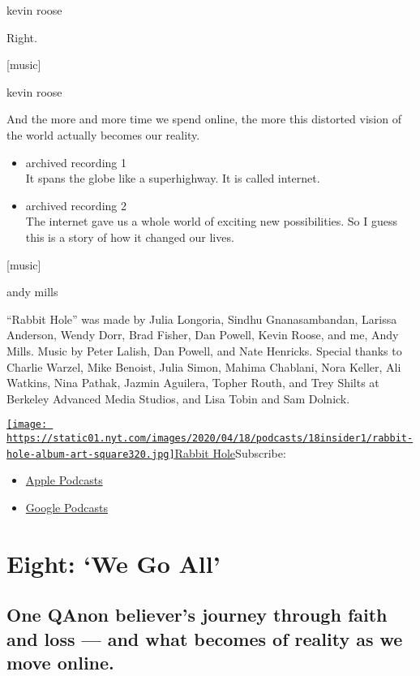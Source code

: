 kevin roose

Right.

{[}music{]}

kevin roose

And the more and more time we spend online, the more this distorted
vision of the world actually becomes our reality.

\begin{itemize}
\item
  archived recording 1\\
  It spans the globe like a superhighway. It is called internet.
\item
  archived recording 2\\
  The internet gave us a whole world of exciting new possibilities. So I
  guess this is a story of how it changed our lives.
\end{itemize}

{[}music{]}

andy mills

``Rabbit Hole'' was made by Julia Longoria, Sindhu Gnanasambandan,
Larissa Anderson, Wendy Dorr, Brad Fisher, Dan Powell, Kevin Roose, and
me, Andy Mills. Music by Peter Lalish, Dan Powell, and Nate Henricks.
Special thanks to Charlie Warzel, Mike Benoist, Julia Simon, Mahima
Chablani, Nora Keller, Ali Watkins, Nina Pathak, Jazmin Aguilera, Topher
Routh, and Trey Shilts at Berkeley Advanced Media Studios, and Lisa
Tobin and Sam Dolnick.

\href{https://www.nytimes.com/column/rabbit-hole}{\texttt{[image: https://static01.nyt.com/images/2020/04/18/podcasts/18insider1/rabbit-hole-album-art-square320.jpg]}Rabbit
Hole}Subscribe:

\begin{itemize}
\tightlist
\item
  \href{https://itunes.apple.com/us/podcast/id1507423923}{Apple
  Podcasts}
\item
  \href{https://podcasts.google.com/?feed=aHR0cHM6Ly9yc3MuYXJ0MTkuY29tL3JhYmJpdC1ob2xl\&ved=0CAAQ4aUDahcKEwjY6Y38xujoAhUAAAAAHQAAAAAQDw}{Google
  Podcasts}
\end{itemize}

\hypertarget{eight-we-go-all-1}{%
\section{Eight: `We Go All'}\label{eight-we-go-all-1}}

\hypertarget{one-qanon-believers-journey-through-faith-and-loss--and-what-becomes-of-reality-as-we-move-online-1}{%
\subsection{One QAnon believer's journey through faith and loss --- and
what becomes of reality as we move
online.}\label{one-qanon-believers-journey-through-faith-and-loss--and-what-becomes-of-reality-as-we-move-online-1}}

